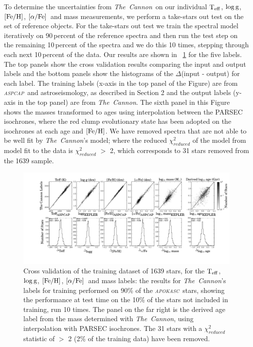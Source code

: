 \documentclass[12pt, preprint]{aastex}
\newcommand{\project}[1]{\textsl{#1}}
\newcommand{\tc}{\project{The~Cannon}}
\newcommand{\apokasc}{\project{\textsc{apokasc}}}
\newcommand{\aspcap}{\project{\textsc{aspcap}}}
\newcommand{\teff}{\mbox{$\rm T_{eff}$}}
\newcommand{\feh}{\mbox{$\rm [Fe/H]$}}
\newcommand{\alphafe}{\mbox{$\rm [\alpha/Fe]$}}
\newcommand{\logg}{\mbox{$\rm \log g$}}
\begin{document}
To determine the uncertainties from \tc\ on our individual \teff, \logg, \feh, \alphafe\ and mass measurements, we perform a take-stars out test on the set of reference objects.
For the take-stars out test we train the spectral model iteratively on 90\,percent of the reference spectra and then run the test step on the remaining 10\,percent of the spectra and we do this 10 times, stepping through each next 10\,percent of the data. Our results are shown in \figurename~\ref{fig:validation1} for the five labels. The top panels show the cross validation results comparing the input and output labels and the bottom panels show the histograms of the $\Delta$(input - output) for each label. The training labels (x-axis in the top panel of the Figure) are from \aspcap\ and astroseismology, as described in Section 2 and the output labels (y-axis in the top panel) are from \tc.  The sixth panel in this Figure shows the masses transformed to ages using interpolation between the PARSEC isochrones, where the red clump evolutionary state has been adopted on the isochrones at each age and \feh. We have removed spectra that are not able to be well fit by \tc's model; where the reduced $\chi_{reduced}^2$ of the model from model fit to the data is $\chi_{reduced}^2$ $>$ 2, which corresponds to 31 stars removed from the 1639 sample.

\begin{figure}[p]
\centering
        \includegraphics[scale=0.4]{./plots/validation_1639_6_quad.pdf}
  \caption{Cross validation of the training dataset of 1639 stars, for the \teff, \logg, \feh, \alphafe\ and mass labels: the results for \tc's labels for training performed on 90\% of the \apokasc\ stars, showing the performance at test time on the 10\% of the stars not included in training, run 10 times. The panel on the far right is the derived age label from the mass determined with \tc, using interpolation with PARSEC isochrones. The 31 stars with a $\chi_{reduced}^2$ statistic of $>$ 2 (2\% of the training data) have been removed.}
\label{fig:validation1}
\end{figure}
\end{document}
